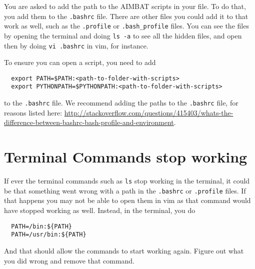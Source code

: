 \documentclass[letterpaper,10pt]{article}
\begin{document}
You are asked to add the path to the AIMBAT scripts in your file. To do that, you add them to the \verb".bashrc" file. There are other files you could add it to that work as well, such as the \verb".profile" or \verb".bash_profile" files. You can see the files by opening the terminal and doing \verb"ls -a" to see all the hidden files, and open then by doing \verb"vi .bashrc" in vim, for instance.

To ensure you can open a script, you need to add
\begin{verbatim}
  export PATH=$PATH:<path-to-folder-with-scripts>
  export PYTHONPATH=$PYTHONPATH:<path-to-folder-with-scripts>
\end{verbatim}
to the \verb".bashrc" file. We recommend adding the paths to the \verb".bashrc" file, for reasons listed here: \url{http://stackoverflow.com/questions/415403/whats-the-difference-between-bashrc-bash-profile-and-environment}.




\section{Terminal Commands stop working}

If ever the terminal commands such as \verb"ls" stop working in the terminal, it could be that something went wrong with a path in the \verb".bashrc" or \verb".profile" files. If that happens you may not be able to open them in vim as that command would have stopped working as well. Instead, in the terminal, you do

\begin{verbatim}
  PATH=/bin:${PATH}
  PATH=/usr/bin:${PATH}
\end{verbatim}

And that should allow the commands to start working again. Figure out what you did wrong and remove that command. 







\end{document}
